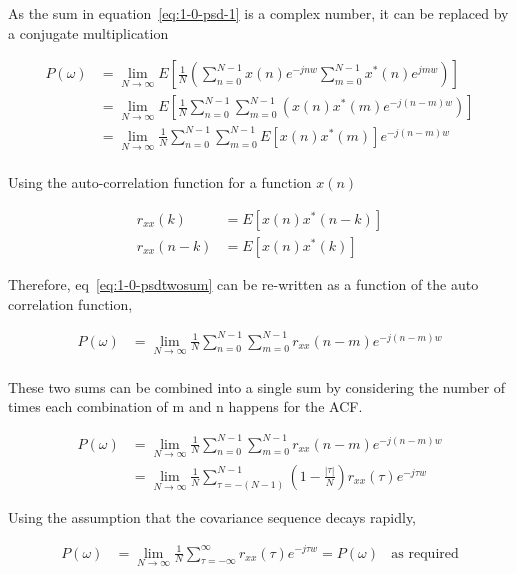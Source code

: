 \documentclass[main.tex]{subfiles}
\begin{document}
As the sum in equation~\ref{eq:1-0-psd-1} is a complex number, it can be replaced by a conjugate multiplication

\begin{align}
P(\omega) &= \lim_{N \rightarrow \infty} 
E \left[ 
\frac{1}{N} \left(\sum_{n=0}^{N-1}x(n)e^{-jnw}\sum_{m=0}^{N-1}x^*(n)e^{jmw}\right)
\right]\\
&= \lim_{N \rightarrow \infty} 
E \left[ 
\frac{1}{N} \sum_{n=0}^{N-1} \sum_{m=0}^{N-1} \left(x(n)x^*(m)e^{-j(n-m)w}\right)
\right]\\
&= \lim_{N \rightarrow \infty} 
\frac{1}{N} \sum_{n=0}^{N-1} \sum_{m=0}^{N-1} E \left[ x(n)x^*(m)
\right] e^{-j(n-m)w} \label{eq:1-0-psdtwosum} \\
\end{align}

Using the auto-correlation function for a function $x(n)$

\begin{align}
r_{xx}(k) &= E\left[x(n)x^*(n-k)\right]\\
r_{xx}(n-k) &= E\left[x(n)x^*(k)\right]
\end{align}

Therefore, eq~\ref{eq:1-0-psdtwosum} can be re-written as a function of the auto correlation function,

\begin{align}
P(\omega) &= \lim_{N \rightarrow \infty} 
\frac{1}{N} \sum_{n=0}^{N-1} \sum_{m=0}^{N-1} r_{xx}(n-m) e^{-j(n-m)w}  \\
\end{align}

These two sums can be combined into a single sum by considering the number of times each combination of m and n happens for the ACF. %

\begin{align}
P(\omega) &= \lim_{N \rightarrow \infty} 
\frac{1}{N} \sum_{n=0}^{N-1} \sum_{m=0}^{N-1} r_{xx}(n-m) e^{-j(n-m)w}\\
&= \lim_{N \rightarrow \infty} 
\frac{1}{N} \sum_{\tau=-(N-1)}^{N-1} \left(1-\frac{|\tau|}{N}\right) r_{xx}(\tau) e^{-j\tau w}
\end{align}

Using the assumption that the covariance sequence decays rapidly,

\begin{align}
P(\omega) &= \lim_{N \rightarrow \infty} 
\frac{1}{N} \sum_{\tau=-\infty}^{\infty}  r_{xx}(\tau) e^{-j\tau w} = P(\omega)\ \ \ \ \text{as required}
\end{align}
\end{document}
